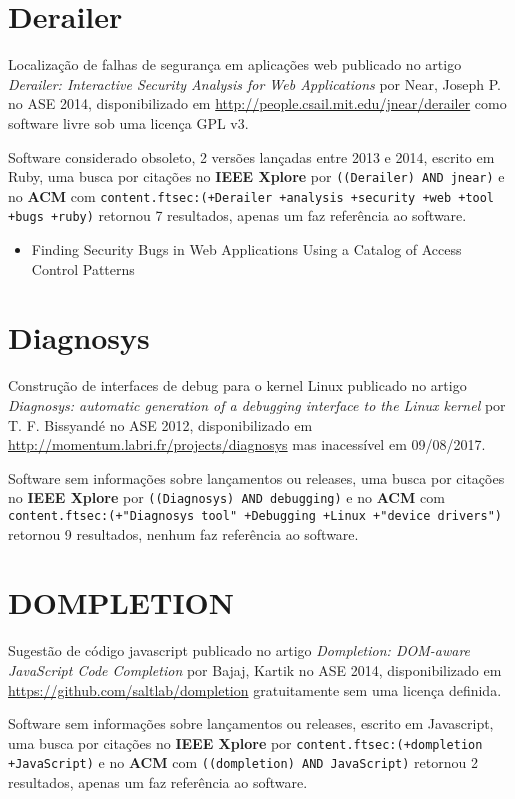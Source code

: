 \section{Derailer}

Localização de falhas de segurança em aplicações web
publicado no artigo {\it Derailer: Interactive Security Analysis for Web Applications}
por Near, Joseph P.
no ASE 2014,
disponibilizado em \url{http://people.csail.mit.edu/jnear/derailer}
como software livre
sob uma licença GPL v3.

Software considerado obsoleto,
2 versões lançadas
entre 2013 e 2014,
escrito em Ruby,
uma busca por citações no {\bf IEEE Xplore} por
\texttt{((Derailer) AND jnear)}
e no {\bf ACM} com
\texttt{content.ftsec:(+Derailer +analysis +security +web +tool +bugs +ruby)}
retornou
7 resultados,
apenas um faz referência ao software.

\begin{itemize}
\item Finding Security Bugs in Web Applications Using a Catalog of Access Control Patterns
\end{itemize}

\section{Diagnosys}

Construção de interfaces de debug para o kernel Linux
publicado no artigo {\it Diagnosys: automatic generation of a debugging interface to the Linux kernel}
por T. F. Bissyandé
no ASE 2012,
disponibilizado em \url{http://momentum.labri.fr/projects/diagnosys}
mas inacessível em 09/08/2017.

Software sem informações sobre lançamentos ou releases,
uma busca por citações no {\bf IEEE Xplore} por
\texttt{((Diagnosys) AND debugging)}
e no {\bf ACM} com
\texttt{content.ftsec:(+"Diagnosys tool" +Debugging +Linux +"device drivers")}
retornou
9 resultados,
nenhum faz referência ao software.


\section{DOMPLETION}

Sugestão de código javascript
publicado no artigo {\it Dompletion: DOM-aware JavaScript Code Completion}
por Bajaj, Kartik
no ASE 2014,
disponibilizado em \url{https://github.com/saltlab/dompletion}
gratuitamente
sem uma licença definida.

Software sem informações sobre lançamentos ou releases,
escrito em Javascript,
uma busca por citações no {\bf IEEE Xplore} por
\texttt{content.ftsec:(+dompletion +JavaScript)}
e no {\bf ACM} com
\texttt{((dompletion) AND JavaScript)}
retornou
2 resultados,
apenas um faz referência ao software.

